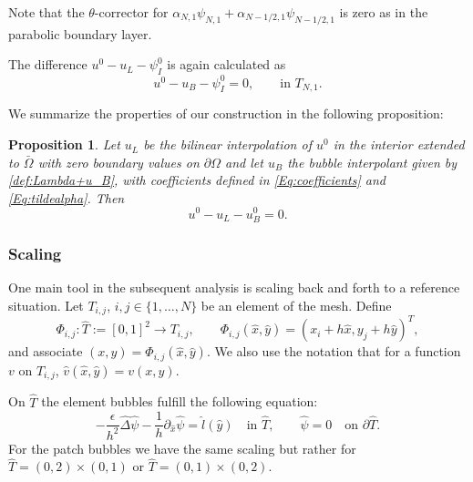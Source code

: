 \documentclass{article}
\newtheorem{propo}[thm]{Proposition}
\begin{document}
Note that the $\theta$-corrector for $\alpha_{N,1}\psi_{N,1} + \alpha_{N-1/2,1}\psi_{N-1/2,1}$ is zero as in
the parabolic boundary layer. 

The difference $u^0 - u_L - \psi^0_I$ is again calculated as
\begin{equation}\label{Eq:r}
u^0 - u_B - \psi^0_I = 0, \qquad\text{in $T_{N,1}$}.
\end{equation}



\bigskip
We summarize the properties of our construction in the following proposition: %
\begin{propo}\label{prop:bilinear0}
Let $u_L$ be the bilinear interpolation of $u^0$ in the interior extended to $\bar{\Omega}$ with zero boundary values on
$\partial\Omega$ and let $u_B$ the bubble interpolant given by \eqref{def:Lambda+u_B}, with coefficients defined in \eqref{Eq:coefficients} and \eqref{Eq:tildealpha}. Then
$$
u^0 - u_L - u_B^0 = 0.
$$
\end{propo}
\subsubsection{Scaling}

One main tool in the subsequent analysis is scaling back and forth
to a reference situation.
Let $T_{i,j}$, $i,j \in\{1,\dots, N\}$ be an element of the mesh. Define
$$
\Phi_{i,j} :\hat{T}:=[0,1]^2 \rightarrow T_{i,j}, 
\qquad
\Phi_{i,j}(\hat{x},\hat{y}) = (x_i + h\hat{x},y_j + h\hat{y})^T,
$$
and associate $(x,y)=\Phi_{i,j}(\hat{x},\hat{y})$.
We also use the notation that for a function $v$ on $T_{i,j}$,
$\hat{v}(\hat{x},\hat{y})=v(x,y)$.

On $\hat{T}$ the element bubbles fulfill the following equation:
\[
-\frac{\epsilon}{h^2} \hat{\Delta} \hat{\psi} - \frac{1}{h} \partial_{\hat{x}}\hat{\psi} = \hat{l}(\hat{y})\quad \text{in }\hat{T},\qquad
   \hat{\psi} = 0\quad\text{on }\partial\hat{T}.
\]
For the patch bubbles we have the same scaling but rather for $\hat{T} = (0,2)\times (0,1)$ or
$\hat{T} = (0,1)\times (0,2)$.
\end{document}
